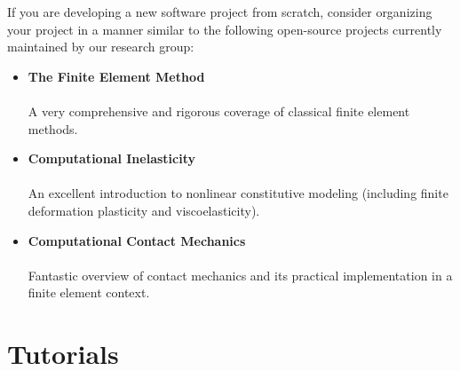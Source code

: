\documentclass[12pt,a4paper,article,oneside]{memoir} %
\begin{document}
If you are developing a new software project from scratch, consider organizing your project in a manner similar to the following open-source projects currently maintained by our research group:
\begin{itemize}
\item \textbf{The Finite Element Method} \\ \citep{hughes_2003} \\ A very comprehensive and rigorous coverage of classical finite element methods.
\item \textbf{Computational Inelasticity} \\ \citep{simo_1998} \\ An excellent introduction to nonlinear constitutive modeling (including finite deformation plasticity and viscoelasticity).
\item \textbf{Computational Contact Mechanics} \\ \citep{wriggers_2006} \\ Fantastic overview of contact mechanics and its practical implementation in a finite element context.
\end{itemize}


\section{Tutorials}
\end{document}

